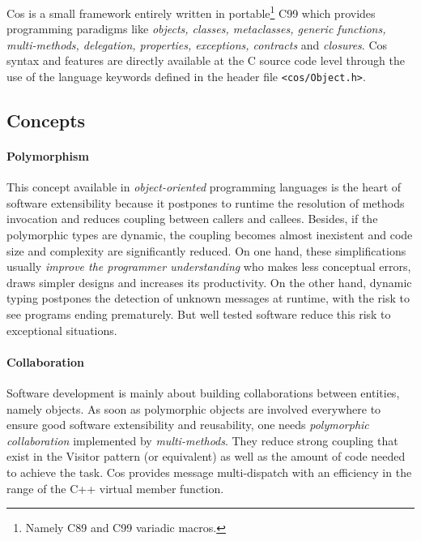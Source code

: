 \documentclass[preprint,10pt]{sigplanconf}
\newcommand{\ProgLang}[1]{{\sc #1}\xspace}
\newcommand{\Cpp}       {\ProgLang{C{\small ++}}}
\newcommand{\Cos}       {\ProgLang{Cos}}
\newcommand{\code}[1]{\lstinline[language=COS,style=samplecode]|#1|}
\begin{document}
\Cos is a small framework entirely written in portable\footnote{Namely C89 and C99 variadic macros.} C99 which provides programming paradigms like {\em objects, classes, metaclasses, generic functions, multi-methods, delegation, properties, exceptions, contracts} and {\em closures}. \Cos syntax and features are directly available at the C source code level through the use of the language keywords defined in the header file \code{<cos/Object.h>}.



\subsection{Concepts}

\paragraph{Polymorphism}

This concept available in {\em object-oriented} programming languages is the heart of software extensibility because it postpones to runtime the resolution of methods invocation and reduces coupling between callers and callees. Besides, if the polymorphic types are dynamic, the coupling becomes almost inexistent and code size and complexity are significantly reduced. On one hand, these simplifications usually {\em improve the programmer understanding} who makes less conceptual errors, draws simpler designs and increases its productivity. On the other hand, dynamic typing postpones the detection of unknown messages at runtime, with the risk to see programs ending prematurely. But well tested software reduce this risk to exceptional situations. 









\paragraph{Collaboration}

Software development is mainly about building collaborations between entities, namely objects. As soon as polymorphic objects are involved everywhere to ensure good software extensibility and reusability, one needs {\em polymorphic collaboration} implemented by {\em multi-methods}. They reduce strong coupling that exist in the Visitor pattern (or equivalent) as well as the amount of code needed to achieve the task. \Cos provides message multi-dispatch with an efficiency in the range of the \Cpp virtual member function.
\end{document}
